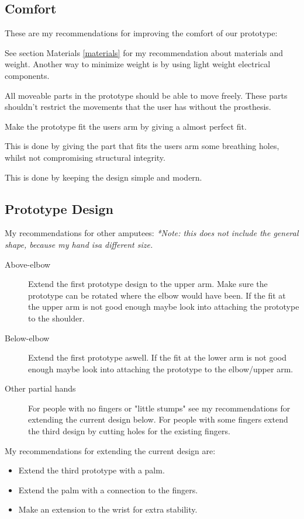 \documentclass[11pt, a4paper]{article}
\begin{document}
\subsection{Comfort}
These are my recommendations for improving the comfort of our prototype:
\begin{description}[align=left]
    \item[Weight] See section Materials \ref{materials} for my recommendation about materials and weight.
                  Another way to minimize weight is by using light weight electrical components. 
    \item[Range of motion] All moveable parts in the prototype should be able to move freely.
                           These parts shouldn't restrict the movements that the user has without the prosthesis.  
    \item[Fit] Make the prototype fit the users arm by giving a almost perfect fit.
    \item[Breathability] This is done by giving the part that fits the users arm some breathing holes, whilst not compromising structural integrity.
    \item[Aesthetics] This is done by keeping the design simple and modern.
\end{description}

\subsection{Prototype Design}
My recommendations for other amputees:
\textit{*Note: this does not include the general shape, because my hand isa different size.}
\begin{description}
    \item[Above-elbow] Extend the first prototype design to the upper arm.
                       Make sure the prototype can be rotated where the elbow would have been.
                       If the fit at the upper arm is not good enough maybe look into attaching the prototype to the shoulder.
    \item[Below-elbow] Extend the first prototype aswell.
                       If the fit at the lower arm is not good enough maybe look into attaching the prototype to the elbow/upper arm.
    \item[Other partial hands] For people with no fingers or "little stumps" see my recommendations for extending the current design below.
                               For people with some fingers extend the third design by cutting holes for the existing fingers.  
\end{description}

My recommendations for extending the current design are:
\begin{itemize}
    \item Extend the third prototype with a palm.
    \item Extend the palm with a connection to the fingers.
    \item Make an extension to the wrist for extra stability.
\end{itemize}

\clearpage
{}

\end{document}
